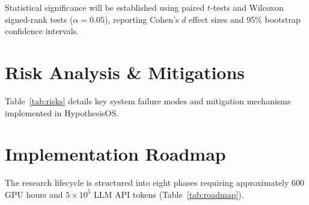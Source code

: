 \documentclass[10pt,twocolumn,3p,times]{article}
\begin{document}
Statistical significance will be established using paired $t$-tests and Wilcoxon signed-rank tests ($\alpha = 0.05$), reporting Cohen's $d$ effect sizes and 95\% bootstrap confidence intervals.

\section{Risk Analysis \& Mitigations}
\label{sec:risks}

Table~\ref{tab:risks} details key system failure modes and mitigation mechanisms implemented in HypothesisOS.

\begin{table}[h]
\centering
\caption{System risk analysis and mitigation protocols.}
\label{tab:risks}
\small
{}
\end{table}

\section{Implementation Roadmap}
\label{sec:roadmap}

The research lifecycle is structured into eight phases requiring approximately 600 GPU hours and $5 \times 10^5$ LLM API tokens (Table~\ref{tab:roadmap}).
\end{document}
